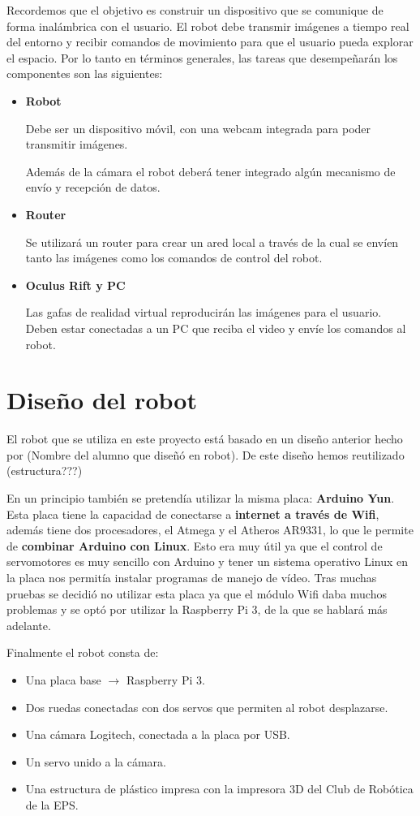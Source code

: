 \documentclass[twoside, 11pt]{epstfg}
\begin{document}
Recordemos que el objetivo es construir un dispositivo que se comunique de forma inalámbrica con el usuario. El robot debe transmir imágenes a tiempo real del entorno y recibir comandos de movimiento para que el usuario pueda explorar el espacio.
Por lo tanto en términos generales, las tareas que desempeñarán los componentes son las siguientes:
\begin{itemize}
	\item \textbf{Robot} 
	
		Debe ser un dispositivo móvil, con una webcam integrada para poder transmitir imágenes.
		
		Además de la cámara el robot deberá tener integrado algún mecanismo de envío y recepción de datos.
	\item \textbf{Router}
	
		Se utilizará un router para crear un ared local a través de la cual se envíen tanto las imágenes como los comandos de control del robot.
	\item \textbf{Oculus Rift y PC}
		
		Las gafas de realidad virtual reproducirán las imágenes para el usuario. Deben estar conectadas a un PC que reciba el video y envíe los comandos al robot.
		
\end{itemize}


\section{Diseño del robot}

El robot que se utiliza en este proyecto está basado en un diseño anterior hecho por (Nombre del alumno que diseñó en robot). De este diseño hemos reutilizado (estructura???)

En un principio también se pretendía utilizar la misma placa: \textbf{Arduino Yun}.
Esta placa tiene la capacidad de conectarse a \textbf{internet a través de Wifi}, además tiene dos procesadores, el Atmega y el Atheros AR9331, lo que le permite de \textbf{combinar Arduino con Linux}. Esto era muy útil ya que el control de servomotores es muy sencillo con Arduino y tener un sistema operativo Linux en la placa nos permitía instalar programas de manejo de vídeo.
Tras muchas pruebas se decidió no utilizar esta placa ya que el módulo Wifi daba muchos problemas y se optó por utilizar la Raspberry Pi 3, de la que se hablará más adelante.

Finalmente el robot consta de:
\begin{itemize}
	\item Una placa base $\rightarrow$ Raspberry Pi 3.
	\item Dos ruedas conectadas con dos servos que permiten al robot desplazarse.
	\item Una cámara Logitech, conectada a la placa por USB.
	\item Un servo unido a la cámara.
	\item Una estructura de plástico impresa con la impresora 3D del Club de Robótica de la EPS.
\end{itemize}
\end{document}
